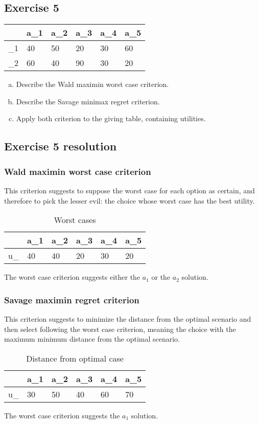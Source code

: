 \documentclass[\main/main.tex]{subfiles}
\begin{document}
\subsection{Exercise 5}

\begin{table}
  \begin{tabular}{L|LLLLL}
         & a_1 & a_2 & a_3 & a_4 & a_5 \\
    \hline
    \w_1 & 40  & 50  & 20  & 30  & 60  \\
    \w_2 & 60  & 40  & 90  & 30  & 20
  \end{tabular}
\end{table}

\begin{enumerate}[a)]
  \item Describe the Wald maximin worst case criterion.
  \item Describe the Savage minimax regret criterion.
  \item Apply both criterion to the giving table, containing utilities.
\end{enumerate}

\subsection{Exercise 5 resolution}
\subsubsection*{Wald maximin worst case criterion}
This criterion suggests to suppose the worst case for each option as certain, and therefore to pick the lesser evil: the choice whose worst case has the best utility.

\begin{table}
  \begin{tabular}{L|LLLLL}
                    & a_1 & a_2 & a_3 & a_4 & a_5 \\
    \hline
    u_{} & 40  & 40  & 20  & 30  & 20  \\
  \end{tabular}
  \caption{Worst cases}
\end{table}

The worst case criterion suggests either the $a_1$ or the $a_2$ solution.

\subsubsection*{Savage maximin regret criterion}
This criterion suggests to minimize the distance from the optimal scenario and then select following the worst case criterion, meaning the choice with the maximum minimum distance from the optimal scenario.

\begin{table}
  \begin{tabular}{L|LLLLL}
                      & a_1 & a_2 & a_3 & a_4 & a_5 \\
    \hline
    u_{} & 30  & 50  & 40  & 60  & 70  \\
  \end{tabular}
  \caption{Distance from optimal case}
\end{table}

The worst case criterion suggests the $a_1$ solution.
\end{document}
